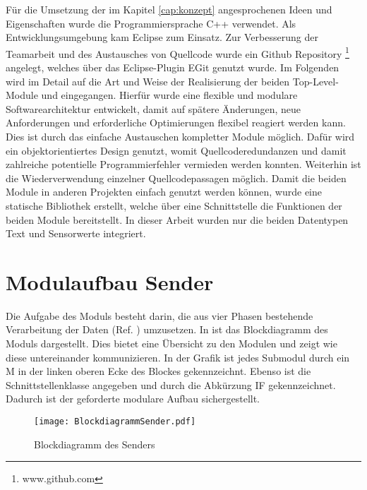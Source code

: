 \label{cap:implementierung}
F{\"u}r die Umsetzung der im Kapitel \ref{cap:konzept} angesprochenen Ideen und
Eigenschaften wurde die Programmiersprache C++ verwendet. Als
Entwicklungsumgebung kam Eclipse zum Einsatz. Zur Verbesserung der Teamarbeit
und des Austausches von Quellcode wurde ein Github Repository
\footnote{www.github.com} angelegt, welches {\"u}ber das Eclipse-Plugin EGit genutzt wurde. \newline Im Folgenden wird
im Detail auf die Art und Weise der Realisierung der beiden Top-Level-Module
 und  eingegangen. Hierf{\"u}r wurde eine flexible und
modulare Softwarearchitektur entwickelt, damit auf sp{\"a}tere {\"A}nderungen, neue Anforderungen
und erforderliche Optimierungen flexibel reagiert werden kann. Dies ist durch
das einfache Austauschen kompletter Module m{\"o}glich.
Daf{\"u}r wird ein objektorientiertes Design genutzt, womit Quellcoderedundanzen und damit
zahlreiche potentielle Programmierfehler vermieden werden konnten.
Weiterhin ist die Wiederverwendung einzelner Quellcodepassagen m{\"o}glich.\newline
Damit die beiden Module in anderen Projekten einfach genutzt werden k{\"o}nnen,
wurde eine statische Bibliothek erstellt, welche {\"u}ber eine Schnittstelle die
Funktionen der beiden Module bereitstellt. In dieser Arbeit wurden nur die beiden
Datentypen Text und Sensorwerte integriert.

\section{Modulaufbau Sender}
 
Die Aufgabe des Moduls  besteht darin, die aus vier Phasen
bestehende Verarbeitung der Daten (Ref. \cite{Daher}) umzusetzen.
In  ist das Blockdiagramm des Moduls 
dargestellt.
Dies bietet eine {\"U}bersicht zu den Modulen und zeigt wie diese untereinander 
kommunizieren. In der Grafik ist jedes Submodul durch ein M in der linken
oberen Ecke des Blockes gekennzeichnt. Ebenso ist die Schnittstellenklasse angegeben
und durch die Abk{\"u}rzung \gls{IF} gekennzeichnet. Dadurch ist der
geforderte modulare Aufbau sichergestellt.

\begin{figure}[H]
\centering
\texttt{[image: BlockdiagrammSender.pdf]} %
\caption{Blockdiagramm des Senders}
\label{fig:BlockdiagrammSender}
\end{figure}

